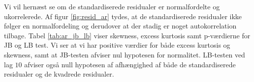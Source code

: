 
 
Vi vil hernæst se om de standardiserede residualer er normalfordelte og ukorrelerede.
Af figur \ref{fig:resid_ar} tydes, at de standardiserede residualer ikke følger en normalfordeling og derudover at der stadig er noget autokorrelation tilbage. 
Tabel \ref{tab:ar_jb_lb} viser skewness, excess kurtosis samt p-værdierne for JB og LB test. 
Vi ser at vi har positive værdier for både excess kurtosis og skewness, samt at JB-testen afviser nul hypotesen for normalitet. 
LB-testen ved lag $10$ afviser også null hypotesen af afhængighed af både de standardiserede residualer og de kvadrede residualer. 








